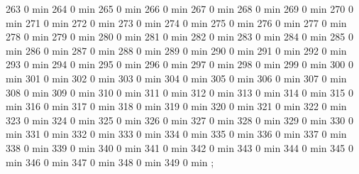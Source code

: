 {263 0 min
264 0 min
265 0 min
266 0 min
267 0 min
268 0 min
269 0 min
270 0 min
271 0 min
272 0 min
273 0 min
274 0 min
275 0 min
276 0 min
277 0 min
278 0 min
279 0 min
280 0 min
281 0 min
282 0 min
283 0 min
284 0 min
285 0 min
286 0 min
287 0 min
288 0 min
289 0 min
290 0 min
291 0 min
292 0 min
293 0 min
294 0 min
295 0 min
296 0 min
297 0 min
298 0 min
299 0 min
300 0 min
301 0 min
302 0 min
303 0 min
304 0 min
305 0 min
306 0 min
307 0 min
308 0 min
309 0 min
310 0 min
311 0 min
312 0 min
313 0 min
314 0 min
315 0 min
316 0 min
317 0 min
318 0 min
319 0 min
320 0 min
321 0 min
322 0 min
323 0 min
324 0 min
325 0 min
326 0 min
327 0 min
328 0 min
329 0 min
330 0 min
331 0 min
332 0 min
333 0 min
334 0 min
335 0 min
336 0 min
337 0 min
338 0 min
339 0 min
340 0 min
341 0 min
342 0 min
343 0 min
344 0 min
345 0 min
346 0 min
347 0 min
348 0 min
349 0 min
};
